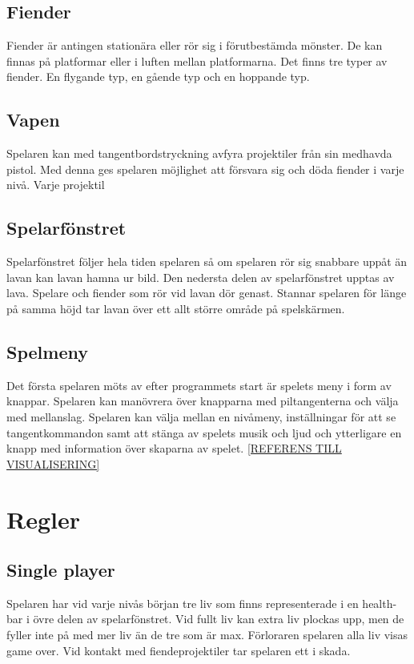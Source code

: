 \documentclass{TDP005mall}
\begin{document}
\subsection{Fiender}
Fiender är antingen stationära eller rör sig i förutbestämda mönster. De kan finnas på platformar eller i luften mellan platformarna. Det finns tre typer av fiender. En flygande typ, en gående typ och en hoppande typ.

\subsection{Vapen}
Spelaren kan med tangentbordstryckning avfyra projektiler från sin medhavda pistol. Med denna ges spelaren möjlighet att försvara sig och döda fiender i varje nivå. Varje projektil 

\subsection{Spelarfönstret}
Spelarfönstret följer hela tiden spelaren så om spelaren rör sig snabbare uppåt än lavan kan lavan hamna ur bild. Den nedersta delen av spelarfönstret upptas av lava. Spelare och fiender som rör vid lavan dör genast. Stannar spelaren för länge på samma höjd tar lavan över ett allt större område på spelskärmen. 


\subsection{Spelmeny}
Det första spelaren möts av efter programmets start är spelets meny i form av knappar. Spelaren kan manövrera över knapparna med piltangenterna och välja med mellanslag. Spelaren kan välja mellan en nivåmeny, inställningar för att se tangentkommandon samt att stänga av spelets musik och ljud och ytterligare en knapp med information över skaparna av spelet.  \ref{REFERENS TILL VISUALISERING} 

\section{Regler}%

\subsection{Single player}
Spelaren har vid varje nivås början tre liv som finns representerade i en health-bar i övre delen av spelarfönstret. Vid fullt liv kan extra liv plockas upp, men de fyller inte på med mer liv än de tre som är max. Förloraren spelaren alla liv visas game over. Vid kontakt med fiendeprojektiler tar spelaren ett i skada.
\end{document}

